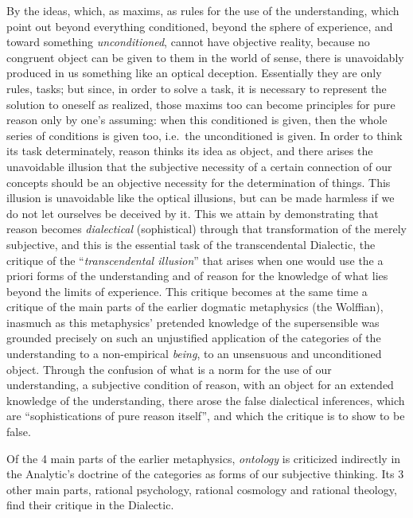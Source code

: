 By the ideas, which, as maxims, as rules for the use of the
understanding, which point out beyond everything conditioned, beyond the
sphere of experience, and toward something \emph{unconditioned}, cannot
have objective reality, because no congruent object can be given to them
in the world of sense, there is unavoidably produced in us something like
an optical deception. Essentially they are only rules,
tasks; but since, in order to solve a task, it is necessary to represent
the solution to oneself as realized, those maxims too can become
principles for pure reason only by one's assuming: when this conditioned
is given, then the whole series of conditions is given too, i.e.\ the
unconditioned is given. In order to think its task determinately, reason
thinks its idea as object, and there arises the unavoidable illusion that
the subjective necessity of a certain connection of our concepts should
be an objective necessity for the determination of things. This illusion
is unavoidable like the optical illusions, but can be made harmless if we
do not let ourselves be deceived by it. This we attain by demonstrating
that reason becomes \emph{dialectical} (sophistical) through that
transformation of the merely subjective, and this is the essential task
of the transcendental Dialectic, the critique of the ``\emph{transcendental
illusion}'' that arises when one would use the a priori forms of the
understanding and of reason for the knowledge of what lies beyond the
limits of experience. This critique becomes at the same time a critique
of the main parts of the earlier dogmatic metaphysics (the Wolffian),
inasmuch as this metaphysics' pretended knowledge of the supersensible was
grounded precisely on such an unjustified application of the categories
of the understanding to a non-empirical \emph{being}, to an unsensuous
and unconditioned object. Through the confusion of what is a norm for the
use of our understanding, a subjective condition of reason, with an
object for an extended knowledge of the understanding, there arose the
false dialectical inferences, which are ``sophistications of pure reason
itself'', and which the critique is to show to be false.

Of the 4 main parts of the earlier metaphysics, \emph{ontology} is
criticized indirectly in the Analytic's doctrine of the categories as
forms of our subjective thinking. Its 3 other main parts, rational
psychology, rational cosmology and rational theology, find their critique
in the Dialectic.

